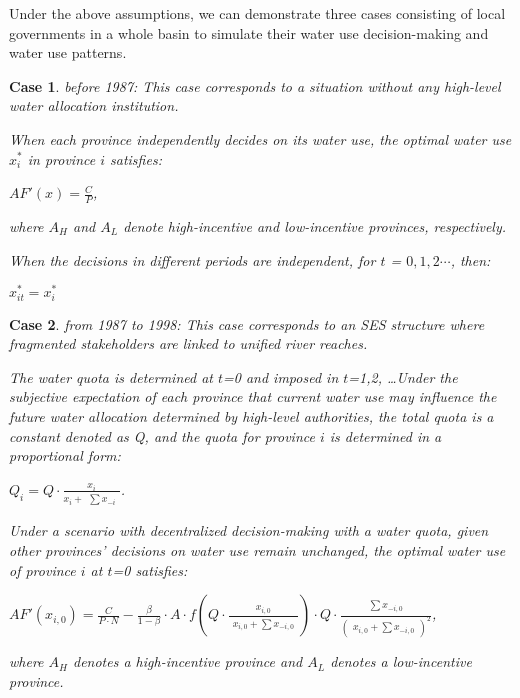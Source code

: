 \documentclass[preprint, 12pt]{elsarticle}
\newtheorem{case}{Case}
\begin{document}
Under the above assumptions, we can demonstrate three cases consisting of local governments in a whole basin to simulate their water use decision-making and water use patterns.

\begin{case} before 1987: This case corresponds to a situation without any high-level water allocation institution.

When each province independently decides on its water use, the optimal water use $x_i^*$ in province $i$ satisfies:

 $AF'(x)=\frac{C}{P}$,

 where $A_H$ and $A_L$ denote high-incentive and low-incentive provinces, respectively.

 When the decisions in different periods are independent, for $t$ = $0, 1, 2 \cdots$, then:

 $x_{it}^* = x_i^*$

 \end{case}

\begin{case} from 1987 to 1998: This case corresponds to an SES structure where fragmented stakeholders are linked to unified river reaches.

 The water quota is determined at $t$=0 and imposed in $t$=1,2, \ldots Under the subjective expectation of each province that current water use may influence the future water allocation determined by high-level authorities, the total quota is a constant denoted as Q, and the quota for province $i$ is determined in a proportional form:

 $Q_i=Q \cdot \frac{x_i}{x_i + \begin{matrix}\sum{x_{-i}} \end{matrix}}$.

Under a scenario with decentralized decision-making with a water quota, given other provinces' decisions on water use remain unchanged, the optimal water use of province $i$ at $t$=0 satisfies:

$AF'(x_{i,0})=\frac{C}{P \cdot N} - \frac{\beta}{1-\beta} \cdot A \cdot f(Q \cdot \frac{x_{i,0}}{\begin{matrix} x_{i,0} + \sum x_{-i,0} \end{matrix}}) \cdot Q \cdot \frac{\begin{matrix} \sum x_{-i,0} \end{matrix}}{(\begin{matrix} x_{i,0} + \sum x_{-i,0} \end{matrix})^2}$,

where $A_H$ denotes a high-incentive province and $A_L$ denotes a low-incentive province.

\end{case}
\end{document}
